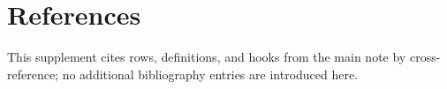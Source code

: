 \section{References}
\begingroup\small This supplement cites rows, definitions, and hooks from the main note by cross-reference; no additional bibliography entries are introduced here.\endgroup
